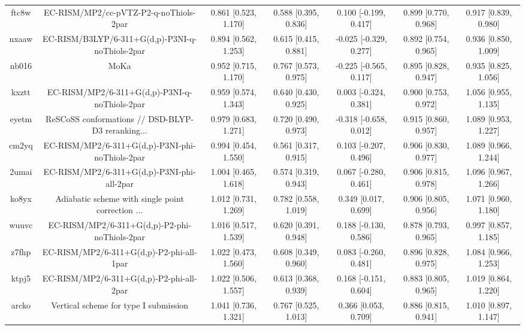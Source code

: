 \documentclass{article}
\begin{document}
\begin{center}
\begin{longtable}{|ccccccc|}
 ftc8w &             EC-RISM/MP2/cc-pVTZ-P2-q-noThiols-2par &  0.861 [0.523, 1.170] &  0.588 [0.395, 0.836] &   0.100 [-0.199, 0.417] &  0.899 [0.770, 0.968] &   0.917 [0.839, 0.980] \\
 nxaaw &    EC-RISM/B3LYP/6-311+G(d,p)-P3NI-q-noThiols-2par &  0.894 [0.562, 1.253] &  0.615 [0.415, 0.881] &  -0.025 [-0.329, 0.277] &  0.892 [0.754, 0.965] &   0.936 [0.850, 1.009] \\
 nb016 &                                               MoKa &  0.952 [0.715, 1.170] &  0.767 [0.573, 0.975] &  -0.225 [-0.565, 0.117] &  0.895 [0.828, 0.947] &   0.935 [0.825, 1.056] \\
 kxztt &      EC-RISM/MP2/6-311+G(d,p)-P3NI-q-noThiols-2par &  0.959 [0.574, 1.343] &  0.640 [0.430, 0.925] &   0.003 [-0.324, 0.381] &  0.900 [0.753, 0.972] &   1.056 [0.955, 1.135] \\
 eyetm &  ReSCoSS conformations // DSD-BLYP-D3 reranking... &  0.979 [0.683, 1.271] &  0.720 [0.490, 0.973] &  -0.318 [-0.658, 0.012] &  0.915 [0.860, 0.957] &   1.089 [0.953, 1.227] \\
 cm2yq &    EC-RISM/MP2/6-311+G(d,p)-P3NI-phi-noThiols-2par &  0.994 [0.454, 1.550] &  0.561 [0.317, 0.915] &   0.103 [-0.207, 0.496] &  0.906 [0.830, 0.977] &   1.089 [0.966, 1.244] \\
 2umai &         EC-RISM/MP2/6-311+G(d,p)-P3NI-phi-all-2par &  1.004 [0.465, 1.618] &  0.574 [0.319, 0.943] &   0.067 [-0.280, 0.461] &  0.906 [0.815, 0.978] &   1.096 [0.967, 1.266] \\
 ko8yx &  Adiabatic scheme with single point correction ... &  1.012 [0.731, 1.269] &  0.782 [0.558, 1.019] &    0.349 [0.017, 0.699] &  0.906 [0.805, 0.956] &   1.071 [0.960, 1.180] \\
 wuuvc &      EC-RISM/MP2/6-311+G(d,p)-P2-phi-noThiols-2par &  1.016 [0.517, 1.539] &  0.620 [0.391, 0.948] &   0.188 [-0.130, 0.586] &  0.878 [0.793, 0.965] &   0.997 [0.857, 1.185] \\
 z7fhp &           EC-RISM/MP2/6-311+G(d,p)-P2-phi-all-1par &  1.022 [0.473, 1.560] &  0.608 [0.349, 0.960] &   0.083 [-0.260, 0.481] &  0.896 [0.828, 0.975] &   1.084 [0.966, 1.253] \\
 ktpj5 &           EC-RISM/MP2/6-311+G(d,p)-P2-phi-all-2par &  1.022 [0.506, 1.557] &  0.613 [0.368, 0.939] &   0.168 [-0.151, 0.604] &  0.883 [0.805, 0.965] &   1.019 [0.864, 1.220] \\
 arcko &              Vertical scheme for type I submission &  1.041 [0.736, 1.321] &  0.767 [0.525, 1.013] &    0.366 [0.053, 0.709] &  0.886 [0.815, 0.941] &   1.010 [0.897, 1.147] \\

\end{longtable}
\end{center}
\end{document}
